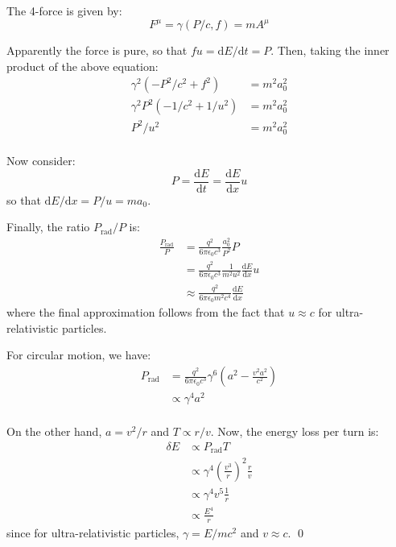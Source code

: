 \documentclass[12pt]{article}
\begin{document}
The 4-force is given by:
\begin{equation}
    F^{\mu} = \gamma (P/c, f) = m A^{\mu}
\end{equation}

Apparently the force is pure, so that $fu = \mathrm{d}E/\mathrm{d}t = P$. Then, taking the inner product of the above equation:
\begin{equation}
    \begin{split}
        \gamma^{2} (-P^{2}/c^{2} + f^{2}) &= m^{2} a_{0}^{2} \\
        \gamma^{2} P^{2} (-1/c^{2} + 1/u^{2}) &= m^{2} a_{0}^{2} \\
        P^{2}/u^{2} &= m^{2} a_{0}^{2} \\
    \end{split}
\end{equation}

Now consider:
\begin{equation}
    P = \frac{\mathrm{d}E}{\mathrm{d}t} = \frac{\mathrm{d}E}{\mathrm{d}x} u
\end{equation}
so that $\mathrm{d}E/\mathrm{d}x = P/u = m a_{0}$.

Finally, the ratio $P_{\text{rad}}/P$ is:
\begin{equation}
    \begin{split}
        \frac{P_{\text{rad}}}{P} &= \frac{q^{2}}{6\pi \epsilon_{0} c^{3}} \frac{a_{0}^{2}}{P^{2}} P \\
        &= \frac{q^{2}}{6\pi \epsilon_{0} c^{3}} \frac{1}{m^{2} u^{2}} \frac{\mathrm{d}E}{\mathrm{d}x} u \\
        &\approx \frac{q^{2}}{6\pi \epsilon_{0} m^{2} c^{4}} \frac{\mathrm{d}E}{\mathrm{d}x}
    \end{split}
\end{equation}
where the final approximation follows from the fact that $u \approx c$ for ultra-relativistic particles.

For circular motion, we have:
\begin{equation}
    \begin{split}
        P_{\text{rad}} &= \frac{q^{2}}{6\pi \epsilon_{0} c^{3}} \gamma^{6} \left( a^{2} - \frac{v^{2}a^{2}}{c^{2}} \right) \\
        &\propto \gamma^{4} a^{2} \\
    \end{split}
\end{equation}

On the other hand, $a = v^{2}/r$ and $T \propto r/v$. Now, the energy loss per turn is:
\begin{equation}
    \begin{split}
        \delta E &\propto P_{\text{rad}} T \\
        &\propto \gamma^{4} \left( \frac{v^{3}}{r} \right)^{2} \frac{r}{v} \\
        &\propto \gamma^{4} v^{5} \frac{1}{r} \\
        &\propto \frac{E^{4}}{r}
    \end{split}
\end{equation}
since for ultra-relativistic particles, $\gamma = E/mc^{2}$ and $v \approx c$.
\qed
\end{document}
